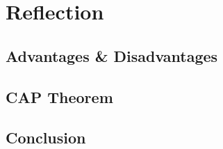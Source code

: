 \section{Reflection} \label{sec:reflectionHazelcast}
\subsection{Advantages \& Disadvantages} \label{subsec:advantagesDisadvantagesHazelcast}
\subsection{CAP Theorem} \label{subsec:capTheoremHazelcast}
\subsection{Conclusion} \label{subsec:conclusionHazelcast}

